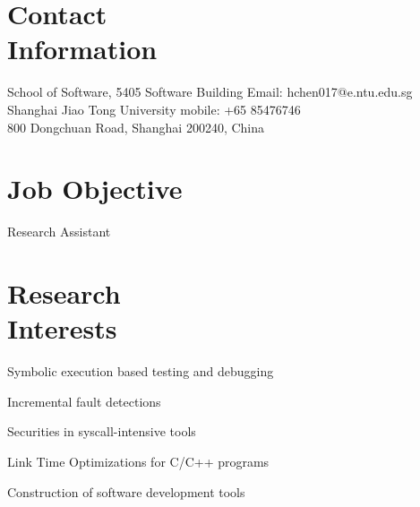 \documentclass[margin, line, 11pt]{resume}
\begin{document}
\begin{resume}

    \section{\mysidestyle Contact\\Information}

    School of Software, 5405 Software Building             \hfill Email: hchen017@e.ntu.edu.sg \vspace{0mm}\\\vspace{0mm}%
    Shanghai Jiao Tong University                          \hfill mobile:\hspace{20pt} +65 85476746          \vspace{0mm}\\\vspace{0mm}%
    800 Dongchuan Road, Shanghai 200240, China
    \vspace{0mm}\\\vspace{-4.5mm}%

    \section{\mysidestyle Job Objective}
    Research Assistant
    \section{\mysidestyle Research\\Interests}

    \begin{list2}
    \item Symbolic execution based testing and debugging
    \item Incremental fault detections
    \item Securities in syscall-intensive tools
    \item Link Time Optimizations for C/C++ programs
    \item Construction of software development tools
    \end{list2}



\end{resume}
\end{document}
